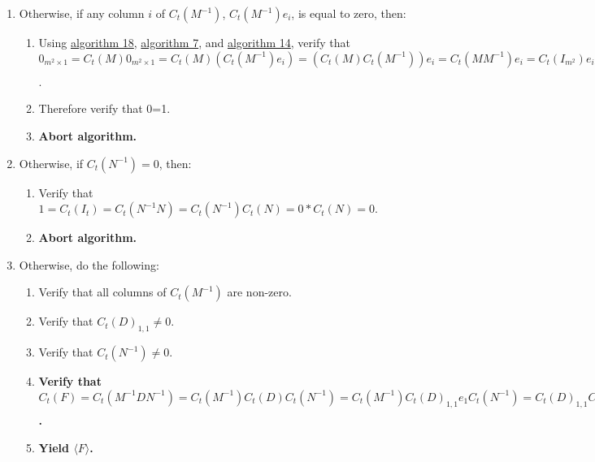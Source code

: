 \documentclass[twocolumn]{article}
\begin{document}
\begin{enumerate}
\begin{enumerate}
					\item Execute \hyperref[sec:algorithm 43]{algorithm 43} on matrix $A$ and polynomial $p=N_{1,i}x^{t-1}+N_{2,i}x^{t-2}+\cdots+N_{t,i}x^0$.
					\item \textbf{Abort algorithm.}
				\end{enumerate}
				\item Otherwise, if any column $i$ of $C_t(M^{-1})$, $C_t(M^{-1})e_i$, is equal to zero, then:
				\begin{enumerate}
					\item Using \hyperref[sec:algorithm 18]{algorithm 18}, \hyperref[sec:algorithm 7]{algorithm 7}, and \hyperref[sec:algorithm 14]{algorithm 14}, verify that $0_{m^2\times 1}=C_t(M)0_{m^2\times 1}=C_t(M)(C_t(M^{-1})e_i)=(C_t(M)C_t(M^{-1}))e_i=C_t(MM^{-1})e_i=C_t(I_{m^2})e_i=I_{\binom{m^2}{t}}e_i=e_i$.
					\item Therefore verify that 0=1.
					\item \textbf{Abort algorithm.}
				\end{enumerate}
				\item Otherwise, if $C_t(N^{-1})=0$, then:
				\begin{enumerate}
					\item Verify that $1=C_t(I_t)=C_t(N^{-1}N)=C_t(N^{-1})C_t(N)=0*C_t(N)=0$.
					\item \textbf{Abort algorithm.}
				\end{enumerate}
				\item Otherwise, do the following:
				\begin{enumerate}
					\item Verify that all columns of $C_t(M^{-1})$ are non-zero.
					\item Verify that ${C_t(D)}_{1,1}\ne 0$.
					\item Verify that $C_t(N^{-1})\ne 0$.
					\item \textbf{Verify that $C_t(F)=C_t(M^{-1}DN^{-1})=C_t(M^{-1})C_t(D)C_t(N^{-1})=C_t(M^{-1}){C_t(D)}_{1,1}e_1C_t(N^{-1})={C_t(D)}_{1,1}C_t(N^{-1})C_t(M^{-1})e_1\ne 0_{\binom{m^2}{t}\times 1}$.}
					\item \textbf{Yield $\langle F\rangle$.}
				\end{enumerate}
			\end{enumerate}
\end{document}

